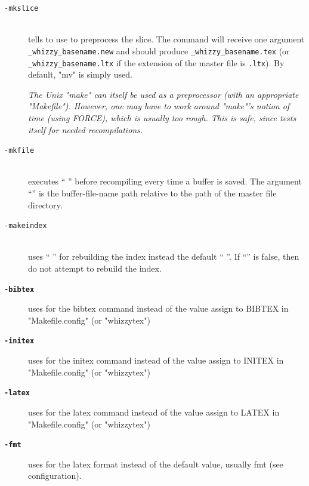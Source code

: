 \documentclass[12pt]{article}
\begin{document}
\begin{description}
\begin{description}
\item[\texttt{-mkslice} ]\indent\\
tells {\whizzy} to use   to preprocess the slice. 
The command  will receive one argument
\texttt{\_whizzy\_basename.new} and should produce 
\texttt{\_whizzy\_basename.tex}
(or \texttt{\_whizzy\_basename.ltx} if the extension of the master file is 
\texttt{.ltx}).
By default, \lst"mv" is simply used.

{\em The Unix \lst"make"  can itself be used as a preprocessor (with an
appropriate \lst"Makefile").  However, one may have to work around
\lst"make"'s notion of time (using FORCE), which is usually too rough. 
This is safe, since {\whizzy} tests itself for needed recompilations.}

\item[\texttt{-mkfile} ]\indent\\
executes `` '' before recompiling every time a
buffer is saved. The argument ``'' is the buffer-file-name
path relative to the path of the master file directory.

\item[\texttt{-makeindex} ]\indent\\
uses `` '' for rebuilding the index instead
the default `` ''.  If ``'' is
false, then do not attempt to rebuild the index.

\item[{\bf {\tt -bibtex }}]\indent

uses  for the bibtex command instead of the value 
assign to BIBTEX in \lst"Makefile.config" (or \lst"whizzytex")

\item[{\bf {\tt -initex }}]\indent

uses  for the initex command instead of the value 
assign to INITEX in \lst"Makefile.config" (or \lst"whizzytex")

\item[{\bf {\tt -latex }}]\indent

uses  for the latex command instead of the value 
assign to LATEX in \lst"Makefile.config" (or \lst"whizzytex")

\item[{\bf {\tt -fmt }}]\indent

uses  for the latex format instead
of the default value, usually fmt (see configuration).


\end{description}
\end{description}
\end{document}
